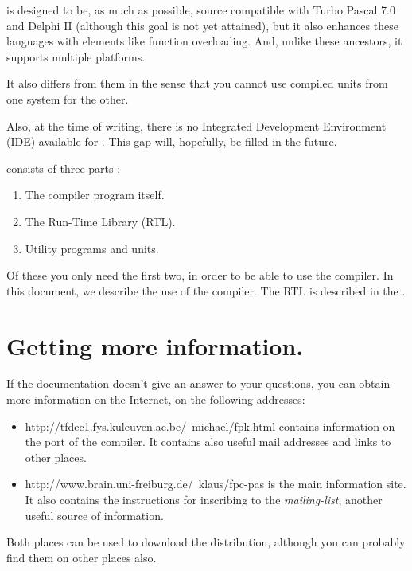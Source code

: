 \documentclass{report}
\begin{document}
\fpc is designed to be, as much as possible, source compatible with 
Turbo Pascal 7.0 and Delphi II (although this goal is not yet attained), 
but it also enhances these languages with elements like function overloading.
And, unlike these ancestors, it supports multiple platforms.

It also differs from them in the sense that you cannot use compiled units
from one system for the other.

Also, at the time of writing, there is no Integrated Development Environment
(IDE) available for \fpc. This gap will, hopefully, be filled in the future.

\fpc consists of three parts :
\begin{enumerate}
\item The compiler program itself.
\item The Run-Time Library (RTL).
\item Utility programs and units.
\end{enumerate}

Of these you only need the first two, in order to be able to use the compiler.
In this document, we describe the use of the compiler. The RTL is described in the
.

\section{Getting more information.}
If the documentation doesn't give an answer to your questions, 
you can obtain more information on the Internet, on the following addresses:
\begin{itemize}
\item {}
{http://tfdec1.fys.kuleuven.ac.be/~michael/fpk.html} contains information 
on the \linux port of the compiler. It contains also useful mail addresses and
links to other places.
\item {}
{http://www.brain.uni-freiburg.de/~klaus/fpc-pas} is the main \fpc information site. 
It also contains the instructions for inscribing to the \textit{mailing-list}, 
another useful source of information.
\end{itemize}
Both places can be used to download the \fpc distribution, although you can 
probably find them on other places also.
\end{document}
